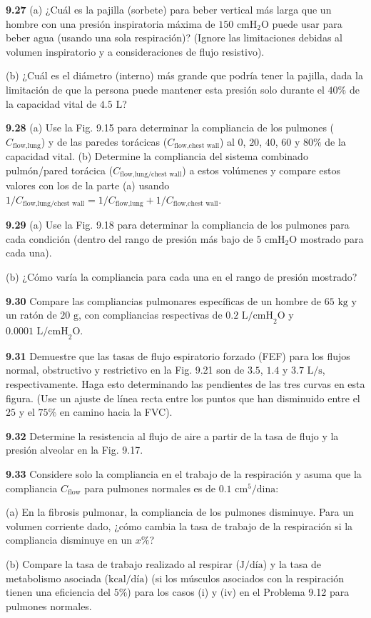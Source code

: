 \documentclass[12pt]{book}
\begin{document}
\noindent \textbf{9.27} (a) ¿Cuál es la pajilla (sorbete) para beber vertical más larga que un hombre con una presión inspiratoria máxima de $150\text{ cmH}_2\text{O}$ puede usar para beber agua (usando una sola respiración)? (Ignore las limitaciones debidas al volumen inspiratorio y a consideraciones de flujo resistivo).
\par\noindent (b) ¿Cuál es el diámetro (interno) más grande que podría tener la pajilla, dada la limitación de que la persona puede mantener esta presión solo durante el $40\%$ de la capacidad vital de $4.5\text{ L}$?

\noindent \textbf{9.28} (a) Use la Fig. 9.15 para determinar la compliancia de los pulmones ($C_{\text{flow,lung}}$) y de las paredes torácicas ($C_{\text{flow,chest wall}}$) al $0$, $20$, $40$, $60$ y $80\%$ de la capacidad vital. (b) Determine la compliancia del sistema combinado pulmón/pared torácica ($C_{\text{flow,lung/chest wall}}$) a estos volúmenes y compare estos valores con los de la parte (a) usando $1/C_{\text{flow,lung/chest wall}} = 1/C_{\text{flow,lung}} + 1/C_{\text{flow,chest wall}}$.

\noindent \textbf{9.29} (a) Use la Fig. 9.18 para determinar la compliancia de los pulmones para cada condición (dentro del rango de presión más bajo de $5\text{ cmH}_2\text{O}$ mostrado para cada una).
\par\noindent (b) ¿Cómo varía la compliancia para cada una en el rango de presión mostrado?

\noindent \textbf{9.30} Compare las compliancias pulmonares específicas de un hombre de $65\text{ kg}$ y un ratón de $20\text{ g}$, con compliancias respectivas de $0.2\text{ L/cmH}_2\text{O}$ y $0.0001\text{ L/cmH}_2\text{O}$.

\noindent \textbf{9.31} Demuestre que las tasas de flujo espiratorio forzado (FEF) para los flujos normal, obstructivo y restrictivo en la Fig. 9.21 son de $3.5$, $1.4$ y $3.7\text{ L/s}$, respectivamente. Haga esto determinando las pendientes de las tres curvas en esta figura. (Use un ajuste de línea recta entre los puntos que han disminuido entre el $25$ y el $75\%$ en camino hacia la FVC).

\noindent \textbf{9.32} Determine la resistencia al flujo de aire a partir de la tasa de flujo y la presión alveolar en la Fig. 9.17.

\noindent \textbf{9.33} Considere solo la compliancia en el trabajo de la respiración y asuma que la compliancia $C_{\text{flow}}$ para pulmones normales es de $0.1\text{ cm}^5/\text{dina}$:
\par\noindent (a) En la fibrosis pulmonar, la compliancia de los pulmones disminuye. Para un volumen corriente dado, ¿cómo cambia la tasa de trabajo de la respiración si la compliancia disminuye en un $x\%$?
\par\noindent (b) Compare la tasa de trabajo realizado al respirar ($\text{J/día}$) y la tasa de metabolismo asociada ($\text{kcal/día}$) (si los músculos asociados con la respiración tienen una eficiencia del $5\%$) para los casos (i) y (iv) en el Problema 9.12 para pulmones normales.
\end{document}
